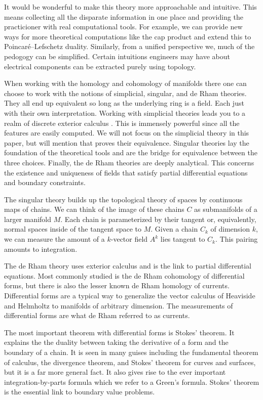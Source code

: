 \documentclass{article}
\begin{document}
It would be wonderful to make this theory more approachable and intuitive. 
This means collecting all the disparate information in one place and providing the practicioner with real computational tools. 
For example, we can provide new ways for more theoretical computations like the cap product and extend this to Poincar\'e--Lefschetz duality. 
Similarly, from a unified perspective we, much of the pedogogy can be simplified. 
Certain intuitions engineers may have about electrical components can be extracted purely using topology.


When working with the homology and cohomology of manifolds there one can choose to work with the notions of simplicial, singular, and de Rham theories. 
They all end up equivalent so long as the underlying ring is a field. 
Each just with their own interpretation. 
Working with simplicial theories leads you to a realm of discrete exterior calculus . 
This is immensely powerful since all the features are easily computed. 
We will not focus on the simplicial theory in this paper, but will mention that \cite{hatcher_algebraic_2002} proves their equivalence. 
Singular theories lay the foundation of the theoretical tools and are the bridge for equivalence between the three choices. 
Finally, the de Rham theories are deeply analytical. 
This concerns the existence and uniqueness of fields that satisfy partial differential equations and boundary constraints.

The singular theory builds up the topological theory of spaces by continuous maps of chains. 
We can think of the image of these chains $C$ as submanifolds of a larger manifold $M$. 
Each chain is parameterized by their tangent or, equivalently, normal spaces inside of the tangent space to $M$. 
Given a chain $C_k$ of dimension $k$, we can measure the amount of a $k$-vector field $A^k$ lies tangent to $C_k$. 
This pairing amounts to integration. 

The de Rham theory uses exterior calculus and is the link to partial differential equations. 
Most commonly studied is the de Rham cohomology of differential forms, but there is also the lesser known de Rham homology of currents. 
Differential forms are a typical way to generalize the vector calculus of Heaviside and Helmholtz  to manifolds of arbitrary dimension. 
The measurements of differential forms are what de Rham referred to as currents. 

The most important theorem with differential forms is Stokes' theorem. 
It explains the the duality between taking the derivative of a form and the boundary of a chain. 
It is seen in many guises including the fundamental theorem of calculus, the divergence theorem, and Stokes' theorem for curves and surfaces, but it is a far more general fact. 
It also gives rise to the ever important integration-by-parts formula which we refer to a Green's formula. 
Stokes' theorem is the essential link to boundary value problems.
\end{document}
